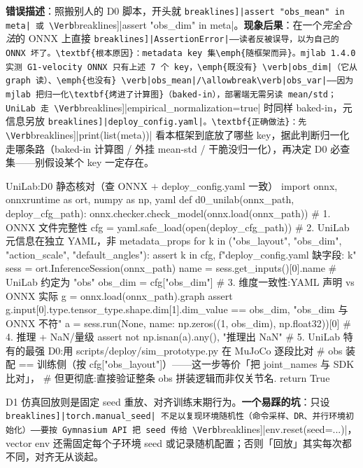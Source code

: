 \begin{pitfall}
\textbf{错误描述}：照搬别人的 D0 脚本，开头就 \Verb[breaklines]|assert "obs_mean" in meta| 或 \Verb[breaklines]|assert "obs_dim" in meta|。\textbf{现象后果}：在一个\emph{完全合法}的 ONNX 上直接 \Verb[breaklines]|AssertionError|——读者反被误导，以为自己的 ONNX 坏了。\textbf{根本原因}：metadata key 集\emph{随框架而异}。mjlab 1.4.0 实测 G1-velocity ONNX 只有上述 7 个 key，\emph{既没有} \verb|obs_dim|（它从 graph 读）、\emph{也没有} \verb|obs_mean|/\allowbreak\verb|obs_var|——因为 mjlab 把归一化\textbf{烤进了计算图}（baked-in），部署端无需另读 mean/std；UniLab 走 \Verb[breaklines]|empirical_normalization=true| 时同样 baked-in，元信息另放 \Verb[breaklines]|deploy_config.yaml|。\textbf{正确做法}：先 \Verb[breaklines]|print(list(meta))| 看本框架到底放了哪些 key，据此判断归一化走哪条路（baked-in 计算图 / 外挂 mean-std / 干脆没归一化），再决定 D0 必查集——别假设某个 key 一定存在。
\end{pitfall}

\begin{codebox}[Python]{UniLab:D0 静态核对（查 ONNX $+$ deploy\_config.yaml 一致）}
import onnx, onnxruntime as ort, numpy as np, yaml
def d0_unilab(onnx_path, deploy_cfg_path):
    onnx.checker.check_model(onnx.load(onnx_path))            # 1. ONNX 文件完整性
    cfg = yaml.safe_load(open(deploy_cfg_path))               # 2. UniLab 元信息在独立 YAML，非 metadata_props
    for k in ("obs_layout", "obs_dim", "action_scale", "default_angles"):
        assert k in cfg, f"deploy_config.yaml 缺字段: {k}"
    sess = ort.InferenceSession(onnx_path)
    name = sess.get_inputs()[0].name                          # UniLab 约定为 "obs"
    obs_dim = cfg["obs_dim"]                                  # 3. 维度一致性:YAML 声明 vs ONNX 实际
    g = onnx.load(onnx_path).graph
    assert g.input[0].type.tensor_type.shape.dim[1].dim_value == obs_dim, "obs_dim 与 ONNX 不符"
    a = sess.run(None, {name: np.zeros((1, obs_dim), np.float32)})[0]   # 4. 推理 + NaN/量级
    assert not np.isnan(a).any(), "推理出 NaN"
    # 5. UniLab 特有的最强 D0:用 scripts/deploy/sim_prototype.py 在 MuJoCo 逐段比对
    #    obs 装配 == 训练侧（按 cfg["obs_layout"]）——这一步等价「把 joint_names 与 SDK 比对」，
    #    但更彻底:直接验证整条 obs 拼装逻辑而非仅关节名.
    return True
\end{codebox}

D1 仿真回放则是固定 seed 重放、对齐训练末期行为。\textbf{一个易踩的坑}：只设 \Verb[breaklines]|torch.manual_seed| 不足以复现环境随机性（命令采样、DR、并行环境初始化）——要按 Gymnasium API 把 seed 传给 \Verb[breaklines]|env.reset(seed=...)|，vector env 还需固定每个子环境 seed 或记录随机配置；否则「回放」其实每次都不同，对齐无从谈起。

